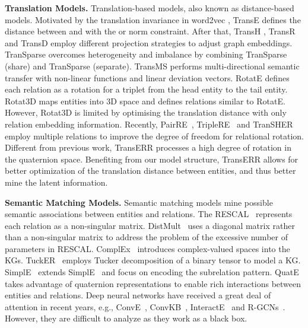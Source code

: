 \documentclass[11pt]{article}
\begin{document}
\textbf{Translation Models.} Translation-based models, also known as distance-based models. Motivated by the translation invariance in word2vec \cite{19mikolov2013efficient}, TransE \cite{7bordes2013translating}  defines the distance between  and   with the  or  norm constraint. After that, TransH \cite{81wang2014knowledge}, TransR \cite{9lin2015learning} and TransD \cite{10ji2015knowledge}  employ different projection strategies to adjust graph embeddings. TranSparse \cite{20ji2016knowledge} overcomes heterogeneity and imbalance by combining TranSparse (share) and TranSparse (separate). TransMS \cite{21yang2019transms} performs multi-directional semantic transfer with non-linear functions and linear deviation vectors. RotatE \cite{31sun2019rotate} defines each relation as a rotation for a triplet from the head entity to the tail entity. Rotat3D \cite{15gao2020rotate3d} maps entities into 3D space and defines relations similar to RotatE. However, Rotat3D is limited by optimising the translation distance with only relation embedding information. Recently, PairRE~\cite{52chao2020pairre}, TripleRE~\cite{yu2022triplere} and TranSHER~\cite{li-etal-2022-transher} employ multiple relations to improve the degree of freedom for relational rotation. Different from previous work, TransERR processes a high degree of rotation in the quaternion space.  Benefiting from our model structure, TransERR allows for better optimization of the translation distance between entities, and thus better mine the latent information.





\textbf{Semantic Matching Models.}
Semantic matching  models mine possible semantic associations between entities and relations. The RESCAL~\cite{27nickel2011three} represents each relation as a non-singular matrix. DistMult~\cite{29yang2014embedding} uses a diagonal matrix rather than a non-singular matrix to address the problem of the excessive number of parameters in RESCAL. ComplEx~\cite{14trouillon2016complex} introduces complex-valued spaces into the KGs. TuckER~\cite{TuckER2019tucker} employs Tucker decomposition of a binary tensor to model a KG. SimplE~\cite{58fatemi2019improved} extends SimplE~\cite{kazemi2018simple} and focus on encoding the subrelation pattern. QuatE~\cite{zhang2019quaternion} takes advantage of quaternion representations to enable rich interactions between entities and relations. Deep neural networks have received a great deal of attention in recent years, e.g., ConvE~\cite{dettmers2018convolutional}, ConvKB~\cite{nguyen2017novel}, InteractE~\cite{vashishth2020interacte} and R-GCNs~\cite{schlichtkrull2018modeling}. However, they are difficult to analyze as they work as a black box.
\end{document}
